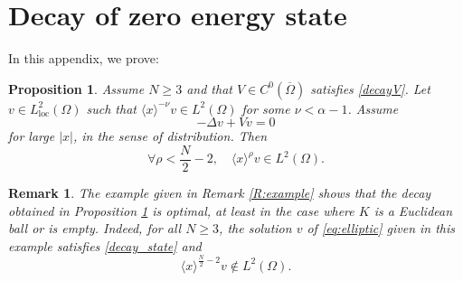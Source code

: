 \documentclass[10pt,leqno]{amsart}
\newtheorem{proposition}[theorem]{Proposition}
\newtheorem{remark}[theorem]{Remark}
\theoremstyle{definition}%
\theoremstyle{remark}
\numberwithin{equation}{section}
\renewcommand{\^}{\widehat}%
\begin{document}
\section{Decay of zero energy state}
\label{A:zero}
In this appendix, we prove:
\begin{proposition}
\label{P:decay_resonance}
Assume $N\geq 3$ and that $V\in C^0(\overline{\Omega})$ satisfies \eqref{decayV}.
Let $v\in L^2_{\mathrm{loc}}(\Omega)$ such that $\langle x\rangle^{-\nu}v\in L^2(\Omega)$ for some $\nu<\alpha-1$. Assume 
\begin{equation}
\label{eq:elliptic}
-\Delta v+V v=0 
\end{equation} 
for large $|x|$, in the sense of distribution. Then 
\begin{equation}
\label{decay_state}
\forall \rho <\frac{N}{2}-2,\quad \langle x\rangle^{\rho} v\in L^2(\Omega). 
\end{equation} 
\end{proposition}
\begin{remark}
The example given in Remark \ref{R:example} shows that the decay obtained in Proposition \ref{P:decay_resonance} is optimal, at least in the case where $K$ is a Euclidean ball or is empty. Indeed, for all $N\geq 3$, the solution $v$ of \eqref{eq:elliptic} given in this example satisfies \eqref{decay_state} and 
\begin{equation*}
\langle x\rangle^{\frac{N}{2}-2} v\notin L^2(\Omega). 
\end{equation*} 
\end{remark}
\end{document}
